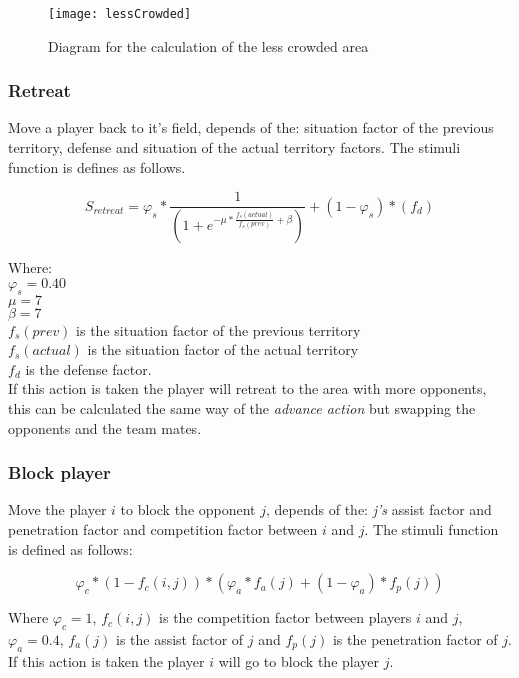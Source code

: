 \documentclass[
10pt, %
a4paper, %
oneside, %
headinclude,footinclude, %
BCOR5mm, %
]{scrartcl}
\begin{document}
\begin{figure}
	\centering
	\texttt{[image: lessCrowded]}
	\caption{Diagram for the calculation of the less crowded area}
	\label{fig:fig}
\end{figure}

\subsubsection{Retreat}
Move a player back to it's field, depends of the: situation factor of the previous territory, defense  and situation of the actual territory factors. The stimuli function is defines as follows.

\begin{equation}
	S_{retreat} = \varphi_s * \frac{1}{(1 + e^{- \mu * \frac{f_{s}(actual)}{f_{s}(prev)} + \beta})} + (1 - \varphi_s) * (f_d)
\end{equation}

Where:\\
$\varphi_{s} = 0.40$ \\
$\mu = 7$\\
$\beta = 7$\\
$f_{s}(prev)$ is the situation factor of the previous territory \\
$f_{s}(actual)$ is the situation factor of the actual territory\\
$f_{d}$ is  the defense factor.\\

If this action is taken the player will retreat to the area with more opponents, this can be calculated the same way of the \textit{advance action} but swapping the opponents and the team mates. 

\subsubsection{Block player}

Move the player $i$ to block the opponent $j$, depends of the: \textit{j's} assist factor and penetration factor and competition factor between $i$ and $j$. The stimuli function is defined as follows:

\begin{equation}
	\varphi_c * (1 - f_{c}(i,j)) * ( \varphi_a * f_{a}(j) + (1-\varphi_a)*f_{p}(j))
\end{equation}

Where $\varphi_c = 1$, $f_c(i,j)$ is the competition factor between players $i$ and $j$, $\varphi_a = 0.4$, $f_a(j)$ is the assist factor of $j$ and $f_p(j)$ is the penetration factor of $j$. If this action is taken the player $i$ will go to block the player $j$.
\end{document}
